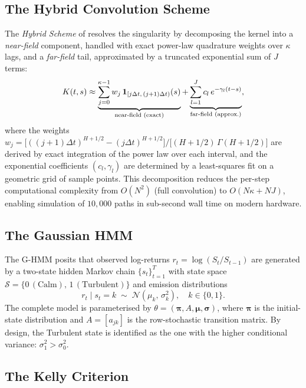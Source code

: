 \documentclass[conference]{IEEEtran}
\newcommand{\N}{\mathcal{N}}
\newcommand{\G}{\Gamma}
\begin{document}
\subsection{The Hybrid Convolution Scheme}

The \emph{Hybrid Scheme} of \citeauthor{bennedsen2017hybrid}
\cite{bennedsen2017hybrid} resolves the singularity by decomposing the
kernel into a \emph{near-field} component, handled with exact
power-law quadrature weights over $\kappa$ lags, and a
\emph{far-field} tail, approximated by a truncated exponential sum of
$J$ terms:
\begin{equation}\label{eq:hybrid}
  K(t,s) \approx \underbrace{\sum_{j=0}^{\kappa-1} w_j
                 \,\mathbf{1}_{[j\Delta t,\,(j+1)\Delta t)}(s)}_{%
                 \text{near-field (exact)}}
               + \underbrace{\sum_{l=1}^{J} c_l\,
                 e^{-\gamma_l(t-s)}}_{\text{far-field (approx.)}},
\end{equation}
where the weights $w_j = \bigl[((j+1)\Delta t)^{H+1/2} -
(j\Delta t)^{H+1/2}\bigr] / \bigl[(H+1/2)\,\G(H+1/2)\bigr]$ are
derived by exact integration of the power law over each interval, and
the exponential coefficients $(c_l, \gamma_l)$ are determined by a
least-squares fit on a geometric grid of sample points.  This
decomposition reduces the per-step computational complexity from
$O(N^2)$ (full convolution) to $O(N\kappa + NJ)$, enabling
simulation of $10{,}000$ paths in sub-second wall time on modern
hardware.

\subsection{The Gaussian HMM}

The G-HMM posits that observed log-returns $r_t = \log(S_t/S_{t-1})$
are generated by a two-state hidden Markov chain $\{s_t\}_{t=1}^T$
with state space $\mathcal{S} = \{0\,(\text{Calm}),\,
1\,(\text{Turbulent})\}$ and emission distributions
\begin{equation}\label{eq:emission}
  r_t \mid s_t = k \;\sim\; \N(\mu_k,\, \sigma_k^2), \quad k \in \{0,1\}.
\end{equation}
The complete model is parameterised by $\theta = (\bm{\pi}, A,
\bm{\mu}, \bm{\sigma})$, where $\bm{\pi}$ is the initial-state
distribution and $A = [a_{jk}]$ is the row-stochastic transition
matrix.  By design, the Turbulent state is identified as the one with
the higher conditional variance: $\sigma_1^2 > \sigma_0^2$.

\subsection{The Kelly Criterion}
\end{document}
